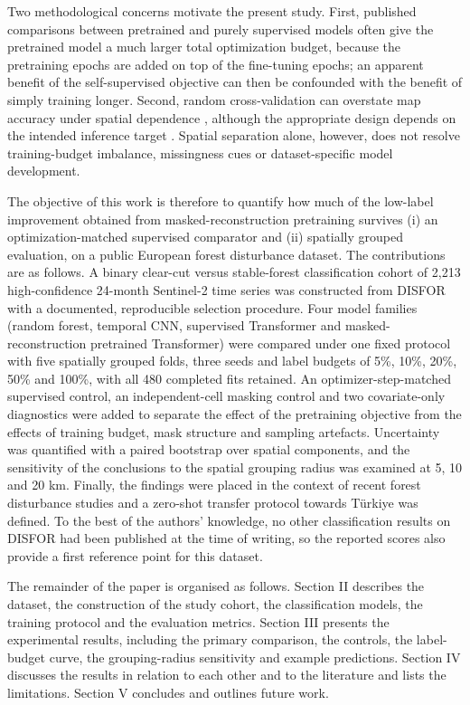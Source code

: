 \documentclass[10pt,a4paper,twocolumn]{article}
\begin{document}
Two methodological concerns motivate the present study. First, published comparisons between pretrained and purely supervised models often give the pretrained model a much larger total optimization budget, because the pretraining epochs are added on top of the fine-tuning epochs; an apparent benefit of the self-supervised objective can then be confounded with the benefit of simply training longer. Second, random cross-validation can overstate map accuracy under spatial dependence \cite{ref4,ref21,ref22}, although the appropriate design depends on the intended inference target \cite{ref23}. Spatial separation alone, however, does not resolve training-budget imbalance, missingness cues or dataset-specific model development.

The objective of this work is therefore to quantify how much of the low-label improvement obtained from masked-reconstruction pretraining survives (i) an optimization-matched supervised comparator and (ii) spatially grouped evaluation, on a public European forest disturbance dataset. The contributions are as follows. A binary clear-cut versus stable-forest classification cohort of 2,213 high-confidence 24-month Sentinel-2 time series was constructed from DISFOR \cite{ref1} with a documented, reproducible selection procedure. Four model families (random forest, temporal CNN, supervised Transformer and masked-reconstruction pretrained Transformer) were compared under one fixed protocol with five spatially grouped folds, three seeds and label budgets of 5\%, 10\%, 20\%, 50\% and 100\%, with all 480 completed fits retained. An optimizer-step-matched supervised control, an independent-cell masking control and two covariate-only diagnostics were added to separate the effect of the pretraining objective from the effects of training budget, mask structure and sampling artefacts. Uncertainty was quantified with a paired bootstrap over spatial components, and the sensitivity of the conclusions to the spatial grouping radius was examined at 5, 10 and 20 km. Finally, the findings were placed in the context of recent forest disturbance studies and a zero-shot transfer protocol towards Türkiye was defined. To the best of the authors' knowledge, no other classification results on DISFOR had been published at the time of writing, so the reported scores also provide a first reference point for this dataset.

The remainder of the paper is organised as follows. Section II describes the dataset, the construction of the study cohort, the classification models, the training protocol and the evaluation metrics. Section III presents the experimental results, including the primary comparison, the controls, the label-budget curve, the grouping-radius sensitivity and example predictions. Section IV discusses the results in relation to each other and to the literature and lists the limitations. Section V concludes and outlines future work.
\end{document}
